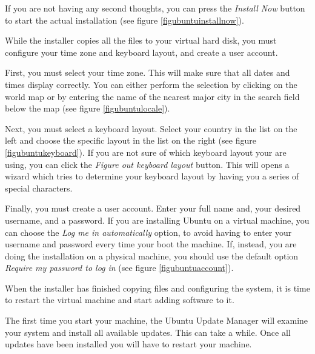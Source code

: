 \documentclass[ebook,10pt,twoside,openright]{memoir}
\begin{document}

If you are not having any second thoughts, you can press the \emph{Install Now} button to start the actual installation (see figure \ref{figubuntuinstallnow}).


While the installer copies all the files to your virtual hard disk, you must configure your time zone and keyboard layout, and create a user account.

First, you must select your time zone. This will make sure that all dates and times display correctly. You can either perform the selection by clicking on the world map or by entering the name of the nearest major city in the search field below the map (see figure \ref{figubuntulocale}).


Next, you must select a keyboard layout. Select your country in the list on the left and choose the specific layout in the list on the right (see figure \ref{figubuntukeyboard}). If you are not sure of which keyboard layout your are using, you can click the \emph{Figure out keyboard layout} button. This will opens a wizard which tries to determine your keyboard layout by having you a series of special characters.


Finally, you must create a user account. Enter your full name and, your desired username, and a password. If you are installing Ubuntu on a virtual machine, you can choose the \emph{Log me in automatically} option, to avoid having to enter your username and password every time your boot the machine. If, instead, you are doing the installation on a physical machine, you should use the default option \emph{Require my password to log in} (see figure \ref{figubuntuaccount}).


When the installer has finished copying files and configuring the system, it is time to restart the virtual machine and start adding software to it.

The first time you start your machine, the Ubuntu Update Manager will examine your system and install all available updates. This can take a while. Once all updates have been installed you will have to restart your machine.
\end{document}
